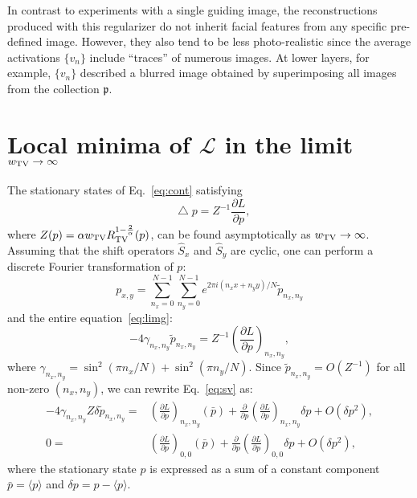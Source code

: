 \documentclass{article}
\def\Img{p}
\def\SetImgs{\mathfrak{p}}
\def\Reg{R}
\def\RegTV{\Reg_{\rm TV}}
\def\wtv{w_{\rm TV}}
\def\Av{v}
\newcommand{\op}[1]{\hat{#1}}
\def\ShiftOp{\op{S}}
\newcommand*\Laplace{\mathop{}\!\mathbin\bigtriangleup}
\newcommand{\avr}[1]{\langle #1 \rangle}
\newcommand{\mc}[1]{\mathcal{#1}}
\newcommand{\Eq}[1]{Eq.~\eqref{#1}}
\newcommand{\pd}[2]{\frac{\partial #1}{\partial #2}}
\begin{document}
{    In contrast to experiments with a single guiding image, the reconstructions produced with this regularizer do not inherit facial features from any specific pre-defined image.
    However, they also tend to be less photo-realistic since the average activations $\{\Av_n\}$ include ``traces'' of numerous images.
    At lower layers, for example, $\{\Av_n\}$ described a blurred image obtained by superimposing all images from the collection $\SetImgs$.

  \section{Local minima of $\mc{L}$ in the limit $\wtv\to \infty$}
  \label{sec:minima}

    The stationary states of \Eq{eq:cont} satisfying
    \begin{equation}
      \label{eq:limg}
      \Laplace \Img = Z^{-1} \pd{L}{\Img},
    \end{equation}
    where $Z(\Img)=\alpha \wtv \RegTV^{1-\frac{2}{\alpha}}(\Img)$, can be found asymptotically as $\wtv\to\infty$.
    Assuming that the shift operators $\ShiftOp_x$ and $\ShiftOp_y$ are cyclic, one can perform a discrete Fourier transformation of $\Img$:
    \begin{equation*}
      \Img_{x,y}=\sum_{n_x=0}^{N-1}\sum_{n_y=0}^{N-1} e^{2\pi i (n_x x + n_y y) / N} \tilde{\Img}_{n_x,n_y}
    \end{equation*}
    and the entire equation~\eqref{eq:limg}:
    \begin{equation}
      \label{eq:sv}
      -4 \gamma_{n_x,n_y} \tilde{\Img}_{n_x,n_y}
      =
      Z^{-1} \left(\pd{L}{\Img}\right)_{n_x,n_y},
    \end{equation}
    where $\gamma_{n_x,n_y} = \sin^2 \left( \pi n_x / N \right) + \sin^2 \left( \pi n_y / N \right)$.
    Since $\tilde{\Img}_{n_x,n_y} = O(Z^{-1})$ for all non-zero $(n_x,n_y)$, we can rewrite \Eq{eq:sv} as:
    \begin{align}
      \label{eq:sv1}
      - 4 \gamma_{n_x,n_y} Z \delta \tilde{\Img}_{n_x,n_y} =&
      \left(\pd{L}{\Img}\right)_{n_x,n_y} (\bar{\Img}) +
      \pd{}{\Img} \left(\pd{L}{\Img}\right)_{n_x,n_y} \delta \Img +
      O(\delta p^2), \\
      \label{eq:sv2}
      0 =&
      \left(\pd{L}{\Img}\right)_{0,0} (\bar{\Img}) + \pd{}{\Img} \left(\pd{L}{\Img}\right)_{0,0} \delta \Img + O(\delta p^2),
    \end{align}
    where the stationary state $\Img$ is expressed as a sum of a constant component $\bar{\Img}=\avr{\Img}$ and $\delta \Img=\Img-\avr{\Img}$.

}
\end{document}
